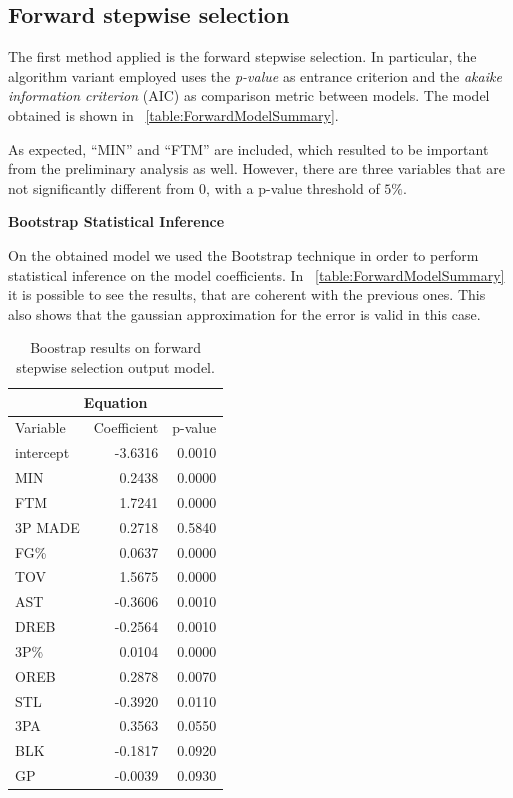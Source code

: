 \subsection{Forward stepwise selection}

The first method applied is the forward stepwise selection. In particular, the algorithm variant employed uses the \textit{p-value} as entrance criterion and the \textit{akaike information criterion} (AIC) as comparison metric between models. The model obtained is shown in \Tab~\ref{table:ForwardModelSummary}.

As expected, ``MIN'' and ``FTM'' are included, which resulted to be important from the preliminary analysis as well. However, there are three variables that are not significantly different from 0, with a p-value threshold of $5\%$.

\textbf{Bootstrap Statistical Inference}

On the obtained model we used the Bootstrap technique in order to perform statistical inference on the model coefficients. In \Tab~\ref{table:ForwardModelSummary} it is possible to see the results, that are coherent with the previous ones. This also shows that the gaussian approximation for the error is valid in this case. 

\begin{table}[H]
	\centering
	\begin{tabular}{|| l | r | r ||} 
		\hline
		\multicolumn{3}{|c|}{Equation} \\
		\hline
		Variable & Coefficient & p-value \\
		\hline
		intercept & -3.6316 & 0.0010 \\
		MIN & 0.2438 & 0.0000 \\
		FTM & 1.7241 & 0.0000 \\
		3P MADE & 0.2718 & 0.5840 \\
		FG\% & 0.0637 & 0.0000 \\
		TOV & 1.5675 & 0.0000 \\
		AST & -0.3606 & 0.0010 \\
		DREB & -0.2564 & 0.0010 \\
		3P\% & 0.0104 & 0.0000 \\
		OREB & 0.2878 & 0.0070 \\
		STL & -0.3920 & 0.0110 \\
		3PA & 0.3563 & 0.0550 \\
		BLK & -0.1817 & 0.0920 \\
		GP & -0.0039 & 0.0930 \\
		\hline
	\end{tabular}
	\caption{Boostrap results on forward stepwise selection output model.}
	\label{table:BootForwardModel}
\end{table}

